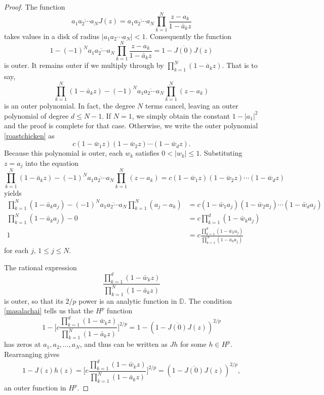 \documentclass{article}
\theoremstyle{plain}
\numberwithin{Theorem}{section}
\numberwithin{equation}{section}
\theoremstyle{plain}
\theoremstyle{definition}
\renewcommand{\leq}{\leqslant}
\begin{document}
\begin{proof}
The function
\[
      \overline{ a_1 a_2 \cdots a_N}J(z) = \overline{ a_1 a_2 \cdots a_N} \prod_{k=1}^{N}\frac{z - a_k}{1-\bar{a}_k z}
\]
takes values in a disk of radius $|a_1 a_2 \cdots a_N|<1$.  Consequently the function
\begin{equation*}%
      1 -  (-1)^N\overline{ a_1 a_2 \cdots a_N} \prod_{k=1}^{N}\frac{z - a_k}{1-\bar{a}_k z}  = 1 - \overline{J(0)}J(z)
\end{equation*}
is outer.  It remains outer if we multiply through by $\prod_{k=1}^{N}(1 - \bar{a}_k z)$.  That is to say,
\begin{equation}\label{roastchicken}
     \prod_{k=1}^{N}(1 - \bar{a}_k z) - (-1)^N \overline{ a_1 a_2 \cdots a_N} \prod_{k=1}^{N}(z - a_k)
\end{equation}
is an outer polynomial.  In fact, the degree $N$ terms cancel, leaving an outer polynomial of degree $d\leq N-1$. If $N = 1$, we simply obtain the constant $1 - |a_1|^2$ and the proof is complete for that case. Otherwise,  we write  the outer polynomial \eqref{roastchicken} as
\begin{equation}\label{outerpoly}
      c(1 - \bar{w}_1 z)(1 - \bar{w}_2 z)\cdots(1 - \bar{w}_{d}z).
\end{equation}
Because this polynomial is outer, each $w_k$ satisfies $0<|w_k| \leq 1$.   Substituting $z = a_j$ into the equation
\[
     \prod_{k=1}^{N}(1 - \bar{a}_k z) - (-1)^N \overline{ a_1 a_2 \cdots a_N} \prod_{k=1}^{N}(z - a_k) = c(1 - \bar{w}_1 z)(1 - \bar{w}_2 z)\cdots(1 - \bar{w}_{d}z)
\]
yields
\begin{align}
      \prod_{k=1}^{N}(1 - \bar{a}_k a_j) - (-1)^N \overline{ a_1 a_2 \cdots a_N} \prod_{k=1}^{N}(a_j - a_k) &= c(1 - \bar{w}_1 a_j)(1 - \bar{w}_2 a_j)\cdots(1 - \bar{w}_{d}a_j) \nonumber \\
       \prod_{k=1}^{N}(1 - \bar{a}_k a_j) -0  &= c \prod_{k=1}^{d}(1 - \bar{w}_k a_j) \nonumber \\
       1 &= c\frac{\prod_{k=1}^{d}(1 - \bar{w}_k a_j)}{\prod_{k=1}^{N}(1 - \bar{a}_k a_j)}  \label{masalachai}
\end{align} for each $j$, $1\leq j\leq N$.

The rational expression 
\[
    \frac{\prod_{k=1}^{d}(1 - \bar{w}_k z)}{\prod_{k=1}^{N}(1 - \bar{a}_k z)}
\]
is outer, so that its $2/p$ power is an analytic function in $\mathbb{D}$.  
The condition \eqref{masalachai} tells us that the $H^p$ function
\begin{equation*}%
    1 - \Bigg[c\frac{\prod_{k=1}^{d}(1 - \bar{w}_k z)}{\prod_{k=1}^{N}(1 - \bar{a}_k z)}\Bigg]^{2/p}  = 1 - \left( 1 - \overline{J(0)} J(z) \right)^{2/p}
\end{equation*}
has zeros at $a_1, a_2,\ldots, a_N$, and thus can be written as $Jh$ for some $h \in H^p$.
  Rearranging gives
\begin{equation}\label{Jhat3}
     1 - J(z)h(z) = \Bigg[c\frac{\prod_{k=1}^{d}(1 - \bar{w}_k z)}{\prod_{k=1}^{N}(1 - \bar{a}_k z)}\Bigg]^{2/p} = \left( 1 - \overline{J(0)} J(z) \right)^{2/p},
\end{equation}
an outer function in $H^p$.


\end{proof}
\end{document}
